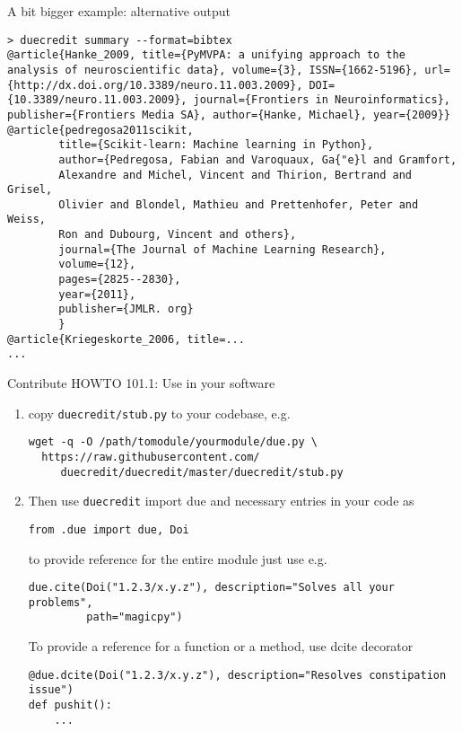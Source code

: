 \documentclass[]{beamer}
\begin{document}
\begin{frame}[t,fragile]{A bit bigger example: alternative output}
\begin{Verbatim}[fontsize=\scriptsize]
> duecredit summary --format=bibtex
@article{Hanke_2009, title={PyMVPA: a unifying approach to the analysis of neuroscientific data}, volume={3}, ISSN={1662-5196}, url={http://dx.doi.org/10.3389/neuro.11.003.2009}, DOI={10.3389/neuro.11.003.2009}, journal={Frontiers in Neuroinformatics}, publisher={Frontiers Media SA}, author={Hanke, Michael}, year={2009}}
@article{pedregosa2011scikit,
        title={Scikit-learn: Machine learning in Python},
        author={Pedregosa, Fabian and Varoquaux, Ga{"e}l and Gramfort,
        Alexandre and Michel, Vincent and Thirion, Bertrand and Grisel,
        Olivier and Blondel, Mathieu and Prettenhofer, Peter and Weiss,
        Ron and Dubourg, Vincent and others},
        journal={The Journal of Machine Learning Research},
        volume={12},
        pages={2825--2830},
        year={2011},
        publisher={JMLR. org}
        }
@article{Kriegeskorte_2006, title=...
...
\end{Verbatim}
\end{frame}


\begin{frame}[fragile]{Contribute HOWTO 101.1: Use in your software}

\begin{enumerate}
\item copy \texttt{duecredit/stub.py} to your codebase, e.g.
\begin{Verbatim}[fontsize=\scriptsize]
wget -q -O /path/tomodule/yourmodule/due.py \
  https://raw.githubusercontent.com/
     duecredit/duecredit/master/duecredit/stub.py
\end{Verbatim}

\item Then use \texttt{duecredit} import due and necessary entries in your code as

\begin{verbatim}
from .due import due, Doi
\end{verbatim}

to provide reference for the entire module just use e.g.

\begin{verbatim}
due.cite(Doi("1.2.3/x.y.z"), description="Solves all your problems",
         path="magicpy")
\end{verbatim}

To provide a reference for a function or a method, use dcite decorator

\begin{verbatim}
@due.dcite(Doi("1.2.3/x.y.z"), description="Resolves constipation issue")
def pushit():
    ...
\end{verbatim}
\end{enumerate}
\end{frame}
\end{document}
